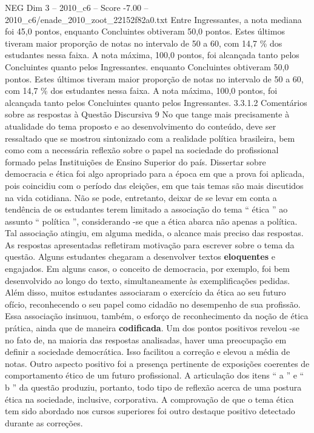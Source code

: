 \begin{textsample}{NEG Dim 3 – 2010\_c6 – Score -7.00 – 2010\_c6/enade\_2010\_zoot\_22152f82a0.txt}
Entre Ingressantes, a nota mediana foi 45,0 pontos, enquanto Concluintes obtiveram 50,0 pontos.
Estes últimos tiveram maior proporção de notas no intervalo de 50 a 60, com 14,7 \% dos estudantes nessa faixa.
A nota máxima, 100,0 pontos, foi alcançada tanto pelos Concluintes quanto pelos Ingressantes. enquanto Concluintes obtiveram 50,0 pontos.
Estes últimos tiveram maior proporção de notas no intervalo de 50 a 60, com 14,7 \% dos estudantes nessa faixa.
A nota máxima, 100,0 pontos, foi alcançada tanto pelos Concluintes quanto pelos Ingressantes. 3.3.1.2 Comentários sobre as respostas à Questão Discursiva 9 No que tange mais precisamente à atualidade do tema proposto e ao desenvolvimento do conteúdo, deve ser ressaltado que se mostrou sintonizado com a realidade política brasileira, bem como com a necessária reflexão sobre o papel na sociedade do profissional formado pelas Instituições de Ensino Superior do país.
Dissertar sobre democracia e ética foi algo apropriado para a época em que a prova foi aplicada, pois coincidiu com o período das eleições, em que tais temas são mais discutidos na vida cotidiana.
Não se pode, entretanto, deixar de se levar em conta a tendência de os estudantes terem limitado a associação do tema “ ética ” ao assunto “ política ”, considerando -se que a ética abarca não apenas a política.
Tal associação atingiu, em alguma medida, o alcance mais preciso das respostas.
As respostas apresentadas refletiram motivação para escrever sobre o tema da questão.
Alguns estudantes chegaram a desenvolver textos \textbf{eloquentes} e engajados.
Em alguns casos, o conceito de democracia, por exemplo, foi bem desenvolvido ao longo do texto, simultaneamente às exemplificações pedidas.
Além disso, muitos estudantes associaram o exercício da ética ao seu futuro ofício, reconhecendo o seu papel como cidadão no desempenho de sua profissão.
Essa associação insinuou, também, o esforço de reconhecimento da noção de ética prática, ainda que de maneira \textbf{codificada}.
Um dos pontos positivos revelou -se no fato de, na maioria das respostas analisadas, haver uma preocupação em definir a sociedade democrática.
Isso facilitou a correção e elevou a média de notas.
Outro aspecto positivo foi a presença pertinente de exposições coerentes de comportamento ético de um futuro profissional.
A articulação dos itens “ a ” e “ b ” da questão produziu, portanto, todo tipo de reflexão acerca de uma postura ética na sociedade, inclusive, corporativa.
A comprovação de que o tema ética tem sido abordado nos cursos superiores foi outro destaque positivo detectado durante as correções.

\end{textsample}
